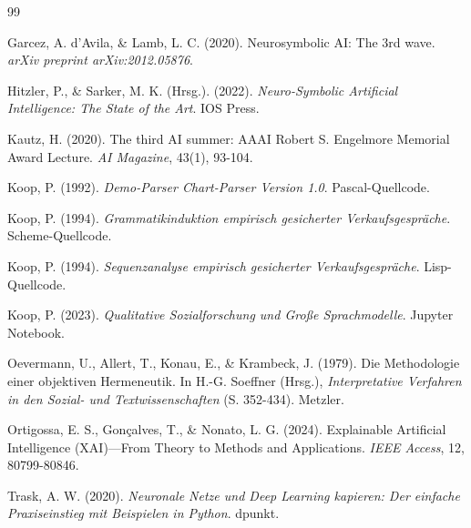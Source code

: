 \documentclass[12pt,a4paper]{article}
\begin{document}
\newpage
\begin{thebibliography}{99}

Garcez, A. d'Avila, \& Lamb, L. C. (2020). Neurosymbolic AI: The 3rd wave. 
\textit{arXiv preprint arXiv:2012.05876}.

Hitzler, P., \& Sarker, M. K. (Hrsg.). (2022). \textit{Neuro-Symbolic Artificial 
Intelligence: The State of the Art}. IOS Press.

Kautz, H. (2020). The third AI summer: AAAI Robert S. Engelmore Memorial Award 
Lecture. \textit{AI Magazine}, 43(1), 93-104.

Koop, P. (1992). \textit{Demo-Parser Chart-Parser Version 1.0}. Pascal-Quellcode.

Koop, P. (1994). \textit{Grammatikinduktion empirisch gesicherter 
Verkaufsgespräche}. Scheme-Quellcode.

Koop, P. (1994). \textit{Sequenzanalyse empirisch gesicherter 
Verkaufsgespräche}. Lisp-Quellcode.

Koop, P. (2023). \textit{Qualitative Sozialforschung und Große Sprachmodelle}. 
Jupyter Notebook.

Oevermann, U., Allert, T., Konau, E., \& Krambeck, J. (1979). Die Methodologie 
einer objektiven Hermeneutik. In H.-G. Soeffner (Hrsg.), \textit{Interpretative 
Verfahren in den Sozial- und Textwissenschaften} (S. 352-434). Metzler.

Ortigossa, E. S., Gonçalves, T., \& Nonato, L. G. (2024). Explainable Artificial 
Intelligence (XAI)—From Theory to Methods and Applications. \textit{IEEE Access}, 
12, 80799-80846.

Trask, A. W. (2020). \textit{Neuronale Netze und Deep Learning kapieren: Der 
einfache Praxiseinstieg mit Beispielen in Python}. dpunkt.

\end{thebibliography}
\end{document}
